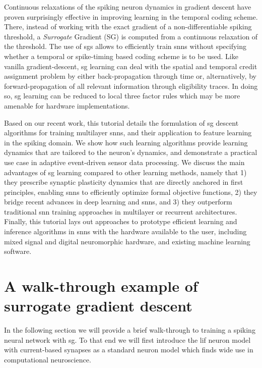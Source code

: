 \documentclass[journal,onecolumn,11pt]{IEEEtran}
\begin{document}
Continuous relaxations of the spiking neuron dynamics in gradient descent have proven surprisingly effective in improving learning in the temporal coding scheme. There, instead of working with the exact gradient of a non-differentiable spiking threshold, a \emph{Surrogate} Gradient (SG)  is computed from a continuous relaxation of the threshold. 
The use of \glspl{sg} allows to efficiently train \glspl{snn} without specifying whether a temporal or spike-timing based coding scheme is to be used. 
Like vanilla gradient-descent, \gls{sg} learning can deal with the spatial and temporal credit assignment problem by either back-propagation through time or, alternatively, by forward-propagation of all relevant information through eligibility traces. In doing so, \gls{sg} learning can be reduced to local three factor rules which may be more amenable for hardware implementations. 

Based on our recent work, this tutorial details the formulation of \gls{sg} descent algorithms for training multilayer \glspl{snn}, and their application to feature learning in the spiking domain.
We show how such learning algorithms provide learning dynamics that are tailored to the neuron's dynamics, and demonstrate a practical use case in adaptive event-driven sensor data processing. 
We discuss the main advantages of \gls{sg} learning compared to other learning methods, namely that 1) they prescribe synaptic plasticity dynamics that are directly anchored in first principles, enabling \glspl{snn} to efficiently optimize formal objective functions, 2) they bridge recent advances in deep learning and \glspl{snn}, and 3) they outperform traditional \gls{snn} training approaches in multilayer or recurrent architectures.  
Finally, this tutorial lays out approaches to prototype efficient learning and inference algorithms in \glspl{snn} with the hardware available to the user, including mixed signal and digital neuromorphic hardware, and existing machine learning software. 

\section{A walk-through example of surrogate gradient descent}

In the following section we will provide a brief walk-through to training a spiking neural network with \gls{sg}.
To that end we will first introduce the \gls{lif} neuron model
with current-based synapses as 
a standard neuron model which finds wide use in computational neuroscience.
\end{document}

